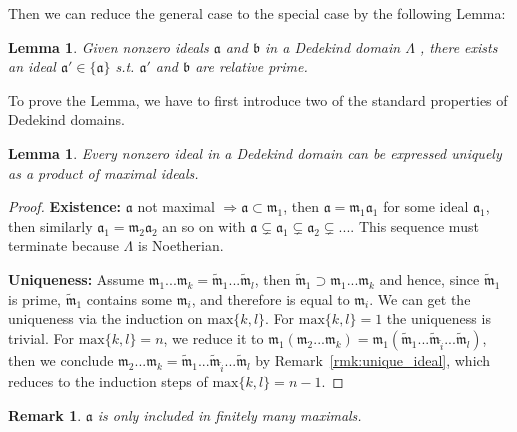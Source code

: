 \documentclass[11pt]{article}
\newtheorem{lemma}[thm]{Lemma}
\newtheorem{rmk}[thm]{Remark}
\newcommand{\sca}{{\mathfrak a}}
\newcommand{\scb}{{\mathfrak b}}
\newcommand{\scm}{{\mathfrak m}}
\newcommand{\Lrta}{\Longrightarrow}
\begin{document}
Then we can reduce the general case to the special case by the following Lemma:
\begin{lemma}\label{lemma:rel_prime}
Given nonzero ideals $\sca$ and $\scb$ in a Dedekind domain $\Lambda$ , there exists an ideal $\sca'\in \{\sca\}$ s.t. $\sca'$ and $\scb$ are relative prime.  
\end{lemma}
To prove the Lemma, we have to first introduce two of the standard properties of Dedekind domains.
\begin{lemma}\label{lem:unique_factoring}
Every nonzero ideal in a Dedekind domain can be expressed uniquely as a product of maximal ideals.
\end{lemma}
\begin{proof}
\textbf{Existence:} $\sca$ not maximal
$\Lrta\sca\subset \scm_1$, then $\sca=\scm_1\sca_1$ for some ideal $\sca_1$, then similarly $\sca_1=\scm_2\sca_2$ an so on with $\sca\subsetneq \sca_1\subsetneq \sca_2\subsetneq....$ This sequence must terminate because $\Lambda$ is Noetherian.

\textbf{Uniqueness:} Assume $\scm_1...\scm_k=\tilde{\scm}_1...\tilde{\scm}_l$, then $\tilde{\scm}_1\supset \scm_1...\scm_k$ and hence, since $\tilde{\scm}_1$ is prime, $\tilde{\scm}_1$ contains some $\scm_i$, and therefore is equal to $\scm_i$. We can get the uniqueness via the induction on $\text{max}\{k,l\}$. For $\text{max}\{k,l\}=1$ the uniqueness is trivial. For $\text{max}\{k,l\}=n$, we reduce it to $\scm_1(\scm_2...\scm_k)=\scm_1(\tilde{\scm}_1...\tilde{\scm}_{\hat{i}}...\tilde{\scm}_l)$, then we conclude $\scm_2...\scm_k=\tilde{\scm}_1...\tilde{\scm}_{\hat{i}}...\tilde{\scm}_l$ by Remark~\ref{rmk:unique_ideal}, which reduces to the induction steps of $\text{max}\{k,l\}=n-1$.
\end{proof}

\begin{rmk}
$\sca$ is only included in finitely many maximals.
\end{rmk}
\end{document}
